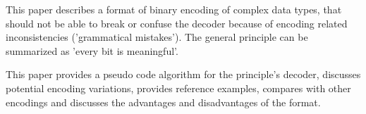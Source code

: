 This paper describes a format of binary encoding of complex data types,
that should not be able to
break or confuse the decoder because of encoding related inconsistencies
('grammatical mistakes').
The general principle can be summarized as 'every bit is meaningful'.

This paper provides a pseudo code algorithm for the principle's decoder,
discusses potential encoding variations, provides reference examples,
compares with other encodings and discusses the advantages
and disadvantages of the format.
